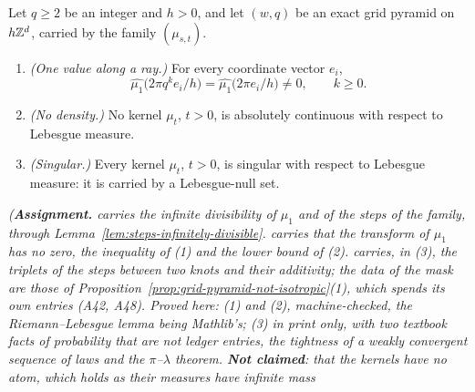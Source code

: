 \begin{proposition}
\label{prop:grid-pyramid-singular-kernels}
\notready
{}
Let $q \ge 2$ be an integer and $h > 0$, and let $(w, q)$ be an exact grid pyramid on $h\mathbb{Z}^d$,
carried by the family $(\mu_{s,t})$.
\begin{enumerate}
\item \emph{(One value along a ray.)} For every coordinate vector $e_i$,
\[
  \widehat{\mu_1}\bigl(2\pi q^ke_i/h\bigr) = \widehat{\mu_1}\bigl(2\pi e_i/h\bigr) \ne 0,
  \qquad k \ge 0 .
\]
\item \emph{(No density.)} No kernel $\mu_t$, $t > 0$, is absolutely continuous with respect to
Lebesgue measure.
\item \emph{(Singular.)} Every kernel $\mu_t$, $t > 0$, is singular with respect to Lebesgue
measure: it is carried by a Lebesgue-null set.
\end{enumerate}
\statusA\quad{}\quad{}\quad{}\quad\emph{(\textbf{Assignment.}
 carries the infinite divisibility of $\mu_1$ and of the steps of the family, through
Lemma~\ref{lem:steps-infinitely-divisible}.  carries that the transform of $\mu_1$ has
no zero, the inequality of (1) and the lower bound of (2).  carries, in (3), the
triplets of the steps between two knots and their additivity; the data of the mask are those of
Proposition~\ref{prop:grid-pyramid-not-isotropic}(1), which spends its own entries (A42, A48).
Proved here: (1) and (2), machine-checked, the Riemann--Lebesgue lemma being Mathlib's; (3) in
print only, with two textbook facts of probability that are not ledger entries, the tightness of a
weakly convergent sequence of laws and the $\pi$--$\lambda$ theorem. \textbf{Not claimed}: that the
kernels have no atom, which holds as their \Levy{} measures have infinite mass
}
\end{proposition}
